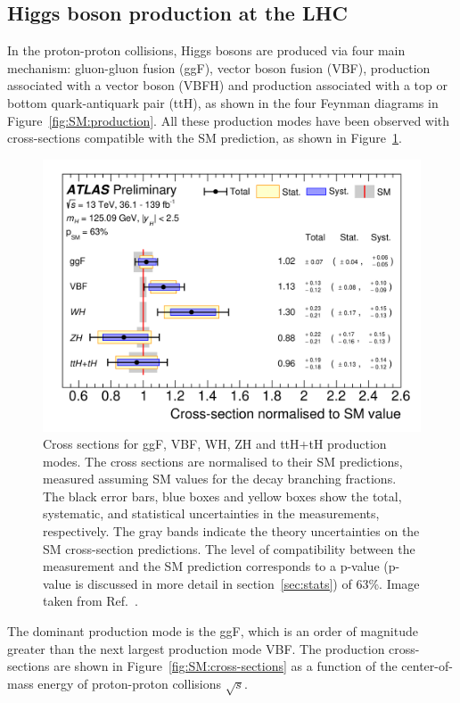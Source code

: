 \subsection{Higgs boson production at the LHC}
In the proton-proton collisions,  Higgs bosons 
are produced via four main mechanism: gluon-gluon fusion (ggF), 
vector boson fusion (VBF), 
production associated with a vector boson (VBFH) and production associated with a 
top or bottom quark-antiquark pair (ttH), as shown in the four Feynman diagrams
in Figure~\ref{fig:SM:production}. All these production modes have been observed
with cross-sections compatible with the SM prediction, 
as shown in Figure~\ref{fig:SM:production-measurement}.


\begin{figure}[htbp]
\centering
  \includegraphics[width=.71\textwidth]{theory/plots/production measurement.png}
    \caption{Cross sections for ggF, VBF, WH, ZH and ttH+tH production modes. 
    The cross sections are normalised to their SM predictions, measured assuming 
    SM values for the decay branching fractions. 
    The black error bars, blue boxes and yellow boxes show the total, 
    systematic, and statistical uncertainties in the measurements, respectively. 
    The gray bands indicate the theory uncertainties on the SM cross-section predictions. 
    The level of compatibility between the measurement 
    and the SM prediction corresponds to a p-value (p-value is discussed in more detail
    in section~\ref{sec:stats}) of 63\%. Image taken from Ref.~\cite{ATLAS-CONF-2021-053}. 
     }
    \label{fig:SM:production-measurement}
\end{figure}

The dominant production mode is the ggF, which is an order of magnitude greater
than the next largest production mode VBF. The production cross-sections are 
shown in Figure~\ref{fig:SM:cross-sections} as a function of the center-of-mass 
energy of proton-proton collisions $\sqrt{s}$.

